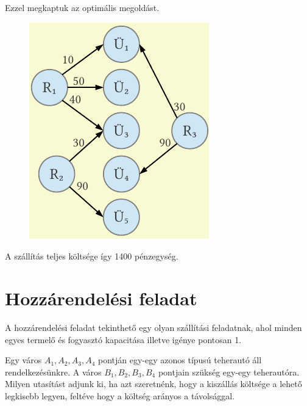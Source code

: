 \documentclass[a4paper,12pt,svgnames]{report}
\begin{document}
\begin{multicols}{2}
\begin{megoldas}
Ezzel megkaptuk az optimális megoldást.
\begin{figure}[H]
\centering
\includegraphics{kepek/szallitasi.pdf}
\end{figure}
A szállítás teljes költsége így 1400 pénzegység. 
\end{megoldas}

\section{Hozzárendelési feladat}

A hozzárendelési feladat tekinthető egy olyan szállítási feladatnak, ahol minden egyes termelő és fogyasztó kapacitása illetve igénye pontosan 1.

\feladatszam Egy város $A_1, A_2, A_3, A_4$ pontján egy-egy azonos típusú teherautó áll rendelkezésünkre. A város $B_1, B_2, B_3, B_4$ pontjain szükség egy-egy teherautóra. Milyen utasítást adjunk ki, ha azt szeretnénk, hogy a kiszállás költsége a lehető legkisebb legyen, feltéve hogy a költség arányos a távolsággal.


\end{multicols}
\end{document}
